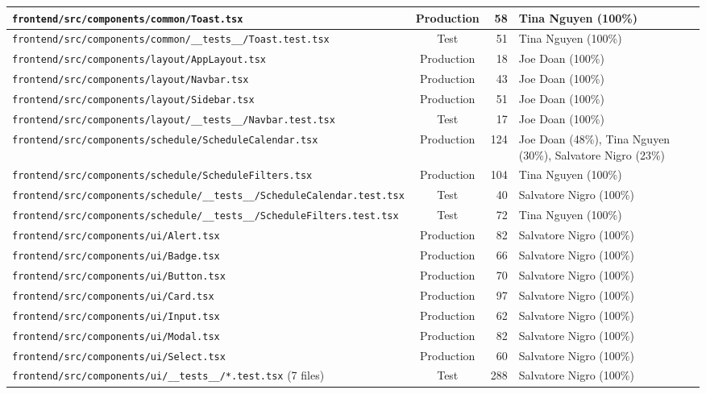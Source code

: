 \documentclass[10pt,letterpaper]{article}
\begin{document}
\begin{longtable}{|p{7.1cm}|c|r|p{6.2cm}|}
\texttt{frontend/src/components/common/Toast.tsx} & Production & 58 & Tina Nguyen (100\%) \\ \hline
\texttt{frontend/src/components/common/\_\_tests\_\_/Toast.test.tsx} & Test & 51 & Tina Nguyen (100\%) \\ \hline
\texttt{frontend/src/components/layout/AppLayout.tsx} & Production & 18 & Joe Doan (100\%) \\ \hline
\texttt{frontend/src/components/layout/Navbar.tsx} & Production & 43 & Joe Doan (100\%) \\ \hline
\texttt{frontend/src/components/layout/Sidebar.tsx} & Production & 51 & Joe Doan (100\%) \\ \hline
\texttt{frontend/src/components/layout/\_\_tests\_\_/Navbar.test.tsx} & Test & 17 & Joe Doan (100\%) \\ \hline
\texttt{frontend/src/components/schedule/ScheduleCalendar.tsx} & Production & 124 & Joe Doan (48\%), Tina Nguyen (30\%), Salvatore Nigro (23\%) \\ \hline
\texttt{frontend/src/components/schedule/ScheduleFilters.tsx} & Production & 104 & Tina Nguyen (100\%) \\ \hline
\texttt{frontend/src/components/schedule/\_\_tests\_\_/ScheduleCalendar.test.tsx} & Test & 40 & Salvatore Nigro (100\%) \\ \hline
\texttt{frontend/src/components/schedule/\_\_tests\_\_/ScheduleFilters.test.tsx} & Test & 72 & Tina Nguyen (100\%) \\ \hline
\texttt{frontend/src/components/ui/Alert.tsx} & Production & 82 & Salvatore Nigro (100\%) \\ \hline
\texttt{frontend/src/components/ui/Badge.tsx} & Production & 66 & Salvatore Nigro (100\%) \\ \hline
\texttt{frontend/src/components/ui/Button.tsx} & Production & 70 & Salvatore Nigro (100\%) \\ \hline
\texttt{frontend/src/components/ui/Card.tsx} & Production & 97 & Salvatore Nigro (100\%) \\ \hline
\texttt{frontend/src/components/ui/Input.tsx} & Production & 62 & Salvatore Nigro (100\%) \\ \hline
\texttt{frontend/src/components/ui/Modal.tsx} & Production & 82 & Salvatore Nigro (100\%) \\ \hline
\texttt{frontend/src/components/ui/Select.tsx} & Production & 60 & Salvatore Nigro (100\%) \\ \hline
\texttt{frontend/src/components/ui/\_\_tests\_\_/*.test.tsx} (7 files) & Test & 288 & Salvatore Nigro (100\%) \\ \hline

\end{longtable}
\end{document}
